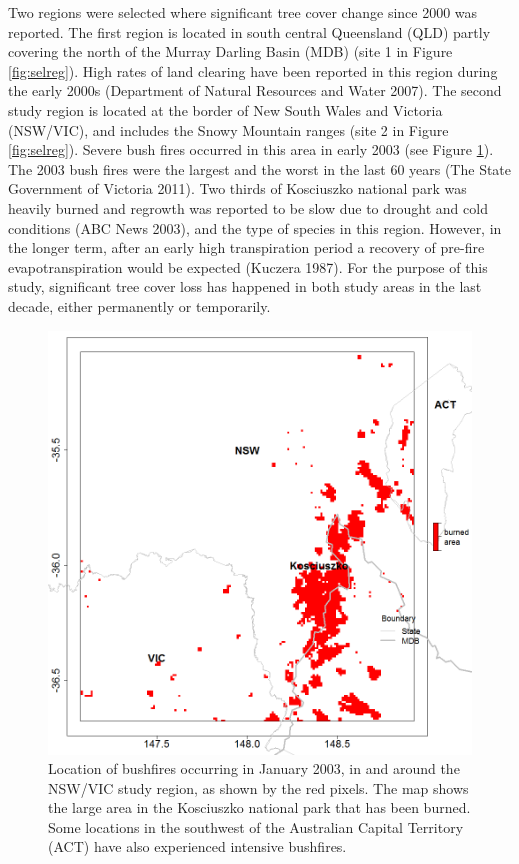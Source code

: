 \documentclass[fleqn,10pt,lineno]{wlpeerj} %
\begin{document}
Two regions were selected where significant tree cover change since 2000
was reported. The first region is located in south central Queensland
(QLD) partly covering the north of the Murray Darling Basin (MDB) (site
1 in Figure \ref{fig:selreg}). High rates of land clearing have been
reported in this region during the early 2000s (Department of Natural
Resources and Water 2007). The second study region is located at the
border of New South Wales and Victoria (NSW/VIC), and includes the Snowy
Mountain ranges (site 2 in Figure \ref{fig:selreg}). Severe bush fires
occurred in this area in early 2003 (see Figure \ref{fig:bushfire}). The
2003 bush fires were the largest and the worst in the last 60 years (The
State Government of Victoria 2011). Two thirds of Kosciuszko national
park was heavily burned and regrowth was reported to be slow due to
drought and cold conditions (ABC News 2003), and the type of species in
this region. However, in the longer term, after an early high
transpiration period a recovery of pre-fire evapotranspiration would be
expected (Kuczera 1987). For the purpose of this study, significant tree
cover loss has happened in both study areas in the last decade, either
permanently or temporarily.

\begin{figure}
\includegraphics[width=0.9\linewidth]{figures/bushfire_nswvic} \caption{Location of bushfires occurring in January 2003, in and around the NSW/VIC study region, as shown by the red pixels. The map shows the large area in the Kosciuszko national park that has been burned. Some locations in the southwest of the Australian Capital Territory (ACT) have also experienced intensive bushfires.}\label{fig:bushfire}
\end{figure}
\end{document}
